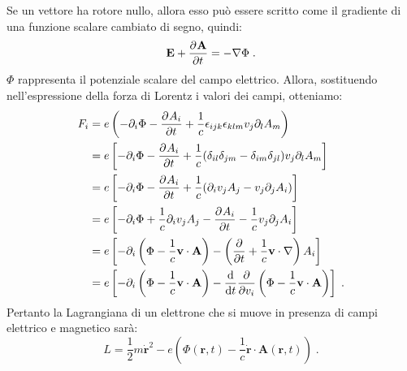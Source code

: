 Se un vettore ha rotore nullo, allora esso può essere scritto come il gradiente di una funzione scalare cambiato di segno, quindi:
\begin{equation}
\mathbf{E}+\frac{\partial^{}\mathbf{A}}{\partial t^{}}=-\nabla\Phi\;.
\end{equation}
$\Phi$ rappresenta il potenziale scalare del campo elettrico. Allora, sostituendo nell'espressione della forza di Lorentz i valori dei campi, otteniamo:
\begin{align}
F_i &= e\left(-\partial_i\Phi-\frac{\partial^{}A_i}{\partial t^{}}+\frac{1}{c}\epsilon_{ijk}\epsilon_{klm}v_j\partial_lA_m\right) \notag \\
&= e\left[-\partial_i\Phi-\frac{\partial^{}A_i}{\partial t^{}}+\frac{1}{c}(\delta_{il}\delta_{jm}-\delta_{im}\delta_{jl})v_j\partial_lA_m\right] \notag \\
&= e\left[-\partial_i\Phi-\frac{\partial^{}A_i}{\partial t^{}}+\frac{1}{c}(\partial_iv_jA_j-v_j\partial_jA_i)\right] \notag \\
&= e\left[-\partial_i\Phi+\frac{1}{c}\partial_iv_jA_j-\frac{\partial^{}A_i}{\partial t^{}}-\frac{1}{c}v_j\partial_jA_i\right] \notag  \\
&= e\left[-\partial_i\left(\Phi-\frac{1}{c}\mathbf{v}\cdot\mathbf{A}\right)-\left(\frac{\partial}{\partial t}+\frac{1}{c}\mathbf{v}\cdot\nabla\right)A_i\right] \notag \\
&= e\left[-\partial_i\left(\Phi-\frac{1}{c}\mathbf{v}\cdot\mathbf{A}\right)-\frac{\mathrm{d}}{\mathrm{d}{t}}\frac{\partial}{\partial v_i}\left(\Phi-\frac{1}{c}\mathbf{v}\cdot\mathbf{A}\right)\right]\;.
\end{align}
Pertanto la Lagrangiana di un elettrone che si muove in presenza di campi elettrico e magnetico sarà:
\begin{equation}
L=\frac{1}{2}m\dot{\mathbf{r}}^2-e\left(\Phi(\mathbf{r},t)-\frac{1}{c}\dot{\mathbf{r}}\cdot\mathbf{A}(\mathbf{r},t)\right)\;.
\end{equation}
